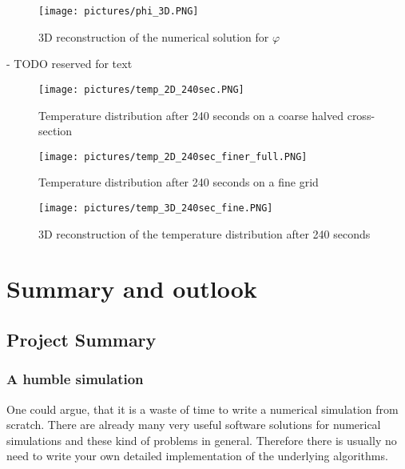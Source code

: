 \documentclass[parskip=half, titlepage=yes, 12pt, BCOR=12mm, DIV=calc]{scrartcl}
\begin{document}
\begin{figure}[H]
    \centering
    \texttt{[image: pictures/phi\_3D.PNG]}
    \caption{3D reconstruction of the numerical solution for $\varphi$}
    \label{phi_3D}
\end{figure}

- TODO reserved for text \\

\begin{figure}[H]
    \centering
    \texttt{[image: pictures/temp\_2D\_240sec.PNG]}
    \caption{Temperature distribution after 240 seconds on a coarse halved cross-section}
    \label{temp_2D_240sec}
\end{figure}


\begin{figure}[H]
    \centering
    \texttt{[image: pictures/temp\_2D\_240sec\_finer\_full.PNG]}
    \caption{Temperature distribution after 240 seconds on a fine grid}
    \label{temp_2D_240sec_finer_full}
\end{figure}


\begin{figure}[H]
    \centering
    \texttt{[image: pictures/temp\_3D\_240sec\_fine.PNG]}
    \caption{3D reconstruction of the temperature distribution after 240 seconds}
    \label{temp_3D_240sec_fine}
\end{figure}




\section{Summary and outlook}

\subsection{Project Summary}
\subsubsection{A humble simulation}
One could argue, that it is a waste of time to write a numerical simulation from scratch. There are already many very useful software solutions for numerical simulations and these kind of problems in general. Therefore there is usually no need to write your own detailed implementation of the underlying algorithms. \\
\end{document}
